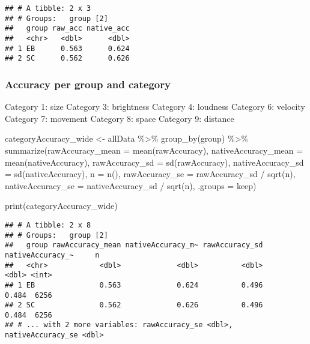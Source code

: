 \documentclass[
]{article}
\newenvironment{Shaded}{\begin{snugshade}}{\end{snugshade}}
\newcommand{\AttributeTok}[1]{\textcolor[rgb]{0.77,0.63,0.00}{#1}}
\newcommand{\FunctionTok}[1]{\textcolor[rgb]{0.00,0.00,0.00}{#1}}
\newcommand{\NormalTok}[1]{#1}
\newcommand{\OtherTok}[1]{\textcolor[rgb]{0.56,0.35,0.01}{#1}}
\newcommand{\SpecialCharTok}[1]{\textcolor[rgb]{0.00,0.00,0.00}{#1}}
\newcommand{\StringTok}[1]{\textcolor[rgb]{0.31,0.60,0.02}{#1}}
\begin{document}
\begin{verbatim}
## # A tibble: 2 x 3
## # Groups:   group [2]
##   group raw_acc native_acc
##   <chr>   <dbl>      <dbl>
## 1 EB      0.563      0.624
## 2 SC      0.562      0.626
\end{verbatim}

\hypertarget{accuracy-per-group-and-category}{%
\subsubsection{Accuracy per group and
category}\label{accuracy-per-group-and-category}}

Category 1: size Category 3: brightness Category 4: loudness Category 6:
velocity Category 7: movement Category 8: space Category 9: distance

\begin{Shaded}
\begin{Highlighting}[]
\NormalTok{categoryAccuracy\_wide }\OtherTok{\textless{}{-}}\NormalTok{ allData }\SpecialCharTok{\%\textgreater{}\%}
  \FunctionTok{group\_by}\NormalTok{(group) }\SpecialCharTok{\%\textgreater{}\%}
  \FunctionTok{summarize}\NormalTok{(}\AttributeTok{rawAccuracy\_mean =} \FunctionTok{mean}\NormalTok{(rawAccuracy), }\AttributeTok{nativeAccuracy\_mean =} \FunctionTok{mean}\NormalTok{(nativeAccuracy), }
            \AttributeTok{rawAccuracy\_sd =} \FunctionTok{sd}\NormalTok{(rawAccuracy), }\AttributeTok{nativeAccuracy\_sd =} \FunctionTok{sd}\NormalTok{(nativeAccuracy),}
            \AttributeTok{n =} \FunctionTok{n}\NormalTok{(),}
            \AttributeTok{rawAccuracy\_se =}\NormalTok{ rawAccuracy\_sd }\SpecialCharTok{/} \FunctionTok{sqrt}\NormalTok{(n), }\AttributeTok{nativeAccuracy\_se =}\NormalTok{ nativeAccuracy\_sd }\SpecialCharTok{/} \FunctionTok{sqrt}\NormalTok{(n),}
            \AttributeTok{.groups =} \StringTok{\textquotesingle{}keep\textquotesingle{}}\NormalTok{)}

\FunctionTok{print}\NormalTok{(categoryAccuracy\_wide)}
\end{Highlighting}
\end{Shaded}

\begin{verbatim}
## # A tibble: 2 x 8
## # Groups:   group [2]
##   group rawAccuracy_mean nativeAccuracy_m~ rawAccuracy_sd nativeAccuracy_~     n
##   <chr>            <dbl>             <dbl>          <dbl>            <dbl> <int>
## 1 EB               0.563             0.624          0.496            0.484  6256
## 2 SC               0.562             0.626          0.496            0.484  6256
## # ... with 2 more variables: rawAccuracy_se <dbl>, nativeAccuracy_se <dbl>
\end{verbatim}
\end{document}
